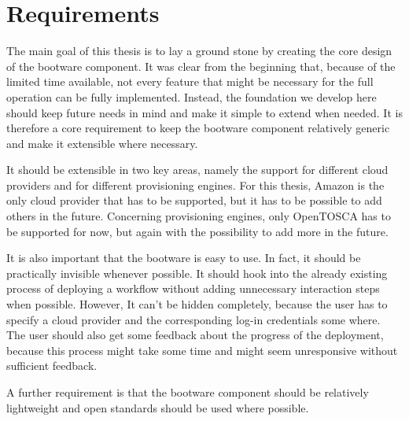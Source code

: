 \section{Requirements}

The main goal of this thesis is to lay a ground stone by creating the core design of the bootware component.
It was clear from the beginning that, because of the limited time available, not every feature that might be necessary for the full operation can be fully implemented.
Instead, the foundation we develop here should keep future needs in mind and make it simple to extend when needed.
It is therefore a core requirement to keep the bootware component relatively generic and make it extensible where necessary.

It should be extensible in two key areas, namely the support for different cloud providers and for different provisioning engines.
For this thesis, Amazon is the only cloud provider that has to be supported, but it has to be possible to add others in the future.
Concerning provisioning engines, only OpenTOSCA has to be supported for now, but again with the possibility to add more in the future.

It is also important that the bootware is easy to use.
In fact, it should be practically invisible whenever possible.
It should hook into the already existing process of deploying a workflow without adding unnecessary interaction steps when possible.
However, It can't be hidden completely, because the user has to specify a cloud provider and the corresponding log-in credentials some where.
The user should also get some feedback about the progress of the deployment, because this process might take some time and might seem unresponsive without sufficient feedback.

A further requirement is that the bootware component should be relatively lightweight and open standards should be used where possible.
